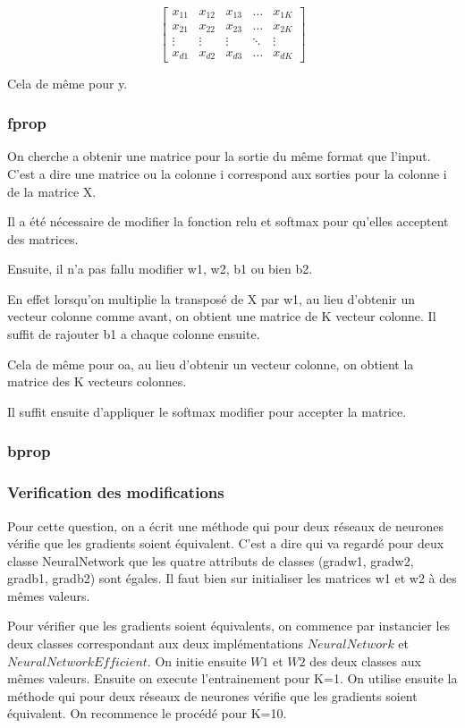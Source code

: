 \documentclass[a4paper,11pt]{article}
\begin{document}
\[
\begin{bmatrix}
    x_{11} & x_{12} & x_{13} & \dots  & x_{1K} \\
    x_{21} & x_{22} & x_{23} & \dots  & x_{2K} \\
    \vdots & \vdots & \vdots & \ddots & \vdots \\
    x_{d1} & x_{d2} & x_{d3} & \dots  & x_{dK}
\end{bmatrix}
\]

Cela de même pour y.

\subsubsection{fprop}


On cherche a obtenir une matrice pour la sortie du même format que l'input. C'est a dire une matrice ou la colonne i correspond aux sorties pour la colonne i de la matrice X.

Il a été nécessaire de modifier la fonction relu et softmax pour qu'elles acceptent des matrices.

Ensuite, il n'a pas fallu modifier w1, w2, b1 ou bien b2.

En effet lorsqu'on multiplie la transposé de X par w1, au lieu d'obtenir un vecteur colonne comme avant, on obtient une matrice de K vecteur colonne. Il suffit de rajouter b1 a chaque colonne ensuite.

Cela de même pour oa, au lieu d'obtenir un vecteur colonne, on obtient la matrice des K vecteurs colonnes.


Il suffit ensuite d'appliquer le softmax modifier pour accepter la matrice.
\subsubsection{bprop}


\subsubsection{Verification des modifications}
Pour cette question, on a écrit une méthode qui pour deux réseaux de neurones vérifie que les gradients soient équivalent. C'est a dire qui va regardé pour deux classe NeuralNetwork que les quatre attributs de classes (gradw1, gradw2, gradb1, gradb2) sont égales. Il faut bien sur initialiser les matrices w1 et w2 à des mêmes valeurs.

Pour vérifier que les gradients soient équivalents, on commence par instancier les deux classes correspondant aux deux implémentations $NeuralNetwork$ et $NeuralNetworkEfficient$. On initie ensuite $W1$ et $W2$ des deux classes aux mêmes valeurs. Ensuite on execute l'entrainement pour K=1. On utilise ensuite la méthode qui pour deux réseaux de neurones vérifie que les gradients soient équivalent. On recommence le procédé pour K=10.
\end{document}
